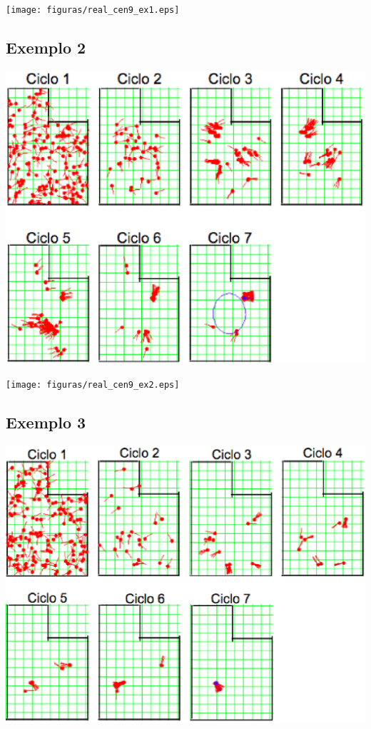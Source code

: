 {\centering
\texttt{[image: figuras/real\_cen9\_ex1.eps]}
\label{img:real_cen9_ex1}
\par}

\subsection{Exemplo 2}

{\centering
\includegraphics[scale=0.4]{figuras/cen9_ex2.eps}
\label{img:cen9_ex2}
\par}

{\centering
\texttt{[image: figuras/real\_cen9\_ex2.eps]}
\label{img:real_cen9_ex2}
\par}

\subsection{Exemplo 3}

{\centering
\includegraphics[scale=0.4]{figuras/cen9_ex3.eps}
\label{img:cen9_ex3}
\par}

